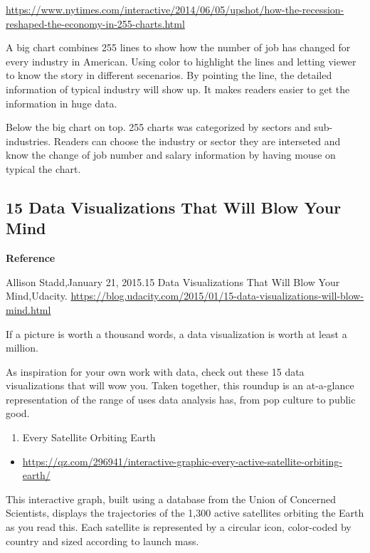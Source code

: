 \documentclass[]{book}
\providecommand{\tightlist}{%
  \setlength{\itemsep}{0pt}\setlength{\parskip}{0pt}}
\theoremstyle{definition}
\theoremstyle{definition}
\theoremstyle{definition}
\theoremstyle{remark}
\begin{document}
\url{https://www.nytimes.com/interactive/2014/06/05/upshot/how-the-recession-reshaped-the-economy-in-255-charts.html}

A big chart combines 255 lines to show how the number of job has changed
for every industry in American. Using color to highlight the lines and
letting viewer to know the story in different secenarios. By pointing
the line, the detailed information of typical industry will show up. It
makes readers easier to get the information in huge data.

Below the big chart on top. 255 charts was categorized by sectors and
sub-industries. Readers can choose the industry or sector they are
interseted and know the change of job number and salary information by
having mouse on typical the chart.

\subsection{15 Data Visualizations That Will Blow Your
Mind}\label{data-visualizations-that-will-blow-your-mind}

\textbf{Reference}

Allison Stadd,January 21, 2015.15 Data Visualizations That Will Blow
Your Mind,Udacity.
\url{https://blog.udacity.com/2015/01/15-data-visualizations-will-blow-mind.html}

If a picture is worth a thousand words, a data visualization is worth at
least a million.

As inspiration for your own work with data, check out these 15 data
visualizations that will wow you. Taken together, this roundup is an
at-a-glance representation of the range of uses data analysis has, from
pop culture to public good.

\begin{enumerate}
\def\labelenumi{\arabic{enumi}.}
\tightlist
\item
  Every Satellite Orbiting Earth
\end{enumerate}

\begin{itemize}
\tightlist
\item
  \url{https://qz.com/296941/interactive-graphic-every-active-satellite-orbiting-earth/}
\end{itemize}

This interactive graph, built using a database from the Union of
Concerned Scientists, displays the trajectories of the 1,300 active
satellites orbiting the Earth as you read this. Each satellite is
represented by a circular icon, color-coded by country and sized
according to launch mass.
\end{document}
